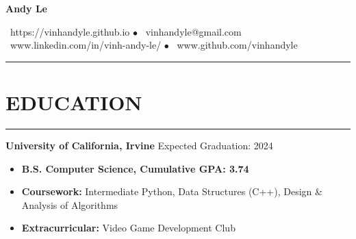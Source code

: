 \documentclass{article}
\begin{document}
   \begin{center}
      \Huge\textbf{Andy Le}\\
      \vspace{3pt}

      \normalsize{\faHome\ https://vinhandyle.github.io} $\bullet$
      \normalsize{\faEnvelope\ vinhandyle@gmail.com}\\

      \vspace{3pt}
      \normalsize{\faLinkedinSquare\ www.linkedin.com/in/vinh-andy-le/} $\bullet$
      \normalsize{\faGithubSquare\ www.github.com/vinhandyle}
   \end{center}
\vspace{-5pt} \hrule \vspace{-5pt}

\section*{EDUCATION} \vspace{-6pt} \hrule \vspace{6pt}
\textbf{University of California, Irvine} \hfill Expected Graduation: 2024
\begin{itemize}
	\item\vspace{-6pt} \textbf{B.S. Computer Science, Cumulative GPA: 3.74}
	\item\vspace{-6pt}\textbf{Coursework:} Intermediate Python, Data Structures (C++), Design \& Analysis of Algorithms
	\item\vspace{-6pt}\textbf{Extracurricular:} Video Game Development Club
\end{itemize}
\vspace{-20pt}
\end{document}
